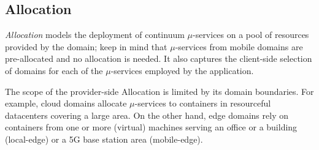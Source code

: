 


\subsection{Allocation}\label{sec:A3-E-allocation}



\textit{Allocation} models the deployment of continuum $\mu$-services on a pool of resources provided by the domain; keep in mind that $\mu$-services from mobile domains are pre-allocated and no allocation is needed. It also captures the client-side selection of domains for each of the $\mu$-services employed by the application.


The scope of the provider-side Allocation is limited by its domain boundaries. For example, cloud domains allocate $\mu$-services to containers in resourceful datacenters covering a large area. On the other hand, edge domains rely on containers from one or more (virtual) machines serving an office or a building (local-edge) or a 5G base station area (mobile-edge). %

